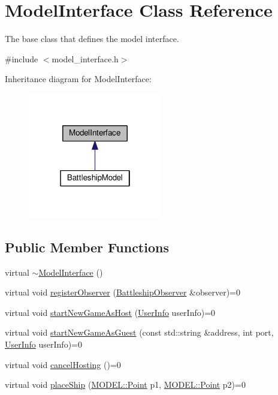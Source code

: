 \hypertarget{classModelInterface}{}\section{Model\+Interface Class Reference}
\label{classModelInterface}


The base class that defines the model interface.  




{\ttfamily \#include $<$model\+\_\+interface.\+h$>$}



Inheritance diagram for Model\+Interface\+:\nopagebreak
\begin{figure}[H]
\begin{center}
\leavevmode
\includegraphics[width=166pt]{classModelInterface__inherit__graph}
\end{center}
\end{figure}
\subsection*{Public Member Functions}
\begin{DoxyCompactItemize}
\item 
virtual \hyperlink{classModelInterface_a185a78e2f43b18782afa624cedb412fc}{$\sim$\+Model\+Interface} ()
\item 
virtual void \hyperlink{classModelInterface_a38d9c2d3c1b09f40910a7ad1aa1aace4}{register\+Observer} (\hyperlink{classBattleshipObserver}{Battleship\+Observer} \&observer)=0
\item 
virtual void \hyperlink{classModelInterface_a36aeb8e4e01dd08fd0416f3269789b31}{start\+New\+Game\+As\+Host} (\hyperlink{classUserInfo}{User\+Info} user\+Info)=0
\item 
virtual void \hyperlink{classModelInterface_aee662ec9439a2344dcd39a0b65dcf639}{start\+New\+Game\+As\+Guest} (const std\+::string \&address, int port, \hyperlink{classUserInfo}{User\+Info} user\+Info)=0
\item 
virtual void \hyperlink{classModelInterface_a2bb725b2837f07c50718296b2acb9bd6}{cancel\+Hosting} ()=0
\item 
virtual void \hyperlink{classModelInterface_aa708cd5411011ade34c2796b3f102612}{place\+Ship} (\hyperlink{classMODEL_1_1Point}{M\+O\+D\+E\+L\+::\+Point} p1, \hyperlink{classMODEL_1_1Point}{M\+O\+D\+E\+L\+::\+Point} p2)=0
\end{DoxyCompactItemize}


